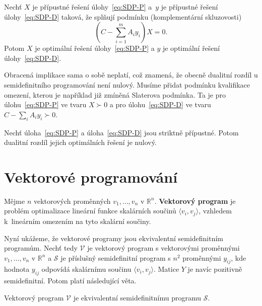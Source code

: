 \begin{vt2}
    Nechť $X$ je přípustné řešení úlohy~\ref{eq:SDP-P} a~$y$ je přípustné řešení úlohy~\ref{eq:SDP-D} taková, že splňují podmínku (komplementární skluzovosti)
    $$
        \left( C - \sum_{i=1}^m A_i y_i \right) X = 0.
    $$
    Potom $X$ je optimální řešení úlohy~\ref{eq:SDP-P} a $y$ je optimální řešení úlohy~\ref{eq:SDP-D}.
\end{vt2}

Obracená implikace sama o sobě neplatí, což znamená, že obecně dualitní rozdíl u semidefinitního programování není nulový. Musíme přidat podmínku kvalifikace omezení, kterou je například již zmíněná Slaterova podmínka. Ta je pro úlohu~\ref{eq:SDP-P} ve tvaru $X \succ 0$ a pro úlohu~\ref{eq:SDP-D} ve tvaru $C - \sum_i A_i y_i \succ 0$.

\begin{vt2}
    Nechť úloha~\ref{eq:SDP-P} a úloha~\ref{eq:SDP-D} jsou striktně přípustné. Potom dualitní rozdíl jejich optimálních řešení je nulový.
\end{vt2}


\section{Vektorové programování}

Mějme $n$ vektorových proměnných $v_1, \dots, v_n$ v $\mathbb{R}^n$. \textbf{Vektorový program} je problém optimalizace lineární funkce skalárních součinů $\langle v_i, v_j \rangle$, vzhledem k~lineárním omezením na tyto skalární součiny.

Nyní ukážeme, že vektorové programy jsou ekvivalentní semidefinitním programům. Nechť tedy $\mathcal{V}$ je vektorový program s vektorovými proměnnými $v_1, \dots, v_n$ v $\mathbb{R}^n$ a $\mathcal{S}$ je příslušný semidefinitní program s $n^2$ proměnnými $y_{ij}$, kde hodnota $y_{ij}$ odpovídá skalárnímu součinu $\langle v_i, v_j \rangle$. Matice $Y$ je navíc pozitivně semidefinitní. Potom platí následující věta.

\begin{vt2}\cite{approximation-algorithms}
    Vektorový program $\mathcal{V}$ je ekvivalentní semidefinitnímu programu $\mathcal{S}$.
\end{vt2}
